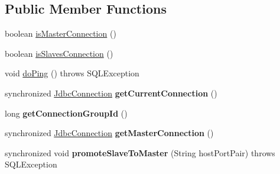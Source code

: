\subsection*{Public Member Functions}
\begin{DoxyCompactItemize}
\item 
boolean \mbox{\hyperlink{classcom_1_1mysql_1_1cj_1_1jdbc_1_1ha_1_1_replication_connection_proxy_ad8c04913b78285025c503997f66cfd59}{is\+Master\+Connection}} ()
\item 
boolean \mbox{\hyperlink{classcom_1_1mysql_1_1cj_1_1jdbc_1_1ha_1_1_replication_connection_proxy_a60e188119cdd841f01e6d39f72f777e9}{is\+Slaves\+Connection}} ()
\item 
void \mbox{\hyperlink{classcom_1_1mysql_1_1cj_1_1jdbc_1_1ha_1_1_replication_connection_proxy_ae2c2446c646d5bc28578f3f35695ef45}{do\+Ping}} ()  throws S\+Q\+L\+Exception 
\item 
\mbox{\label{classcom_1_1mysql_1_1cj_1_1jdbc_1_1ha_1_1_replication_connection_proxy_a1641eba211bf1931920c610bf4a8fa36}} 
synchronized \mbox{\hyperlink{interfacecom_1_1mysql_1_1cj_1_1jdbc_1_1_jdbc_connection}{Jdbc\+Connection}} {\bfseries get\+Current\+Connection} ()
\item 
\mbox{\label{classcom_1_1mysql_1_1cj_1_1jdbc_1_1ha_1_1_replication_connection_proxy_a3d870ba961bc6b4220e2dcbedc648d77}} 
long {\bfseries get\+Connection\+Group\+Id} ()
\item 
\mbox{\label{classcom_1_1mysql_1_1cj_1_1jdbc_1_1ha_1_1_replication_connection_proxy_aa31c17012e953481a21cc12b203b34b1}} 
synchronized \mbox{\hyperlink{interfacecom_1_1mysql_1_1cj_1_1jdbc_1_1_jdbc_connection}{Jdbc\+Connection}} {\bfseries get\+Master\+Connection} ()
\item 
\mbox{\label{classcom_1_1mysql_1_1cj_1_1jdbc_1_1ha_1_1_replication_connection_proxy_ac3d82982ac768a09bfc1072ef054cf20}} 
synchronized void {\bfseries promote\+Slave\+To\+Master} (String host\+Port\+Pair)  throws S\+Q\+L\+Exception 
\item 
\mbox{\label{classcom_1_1mysql_1_1cj_1_1jdbc_1_1ha_1_1_replication_connection_proxy_a6e52fc103ed552935766ffeee2d0ec36}} 

\end{DoxyCompactItemize}

